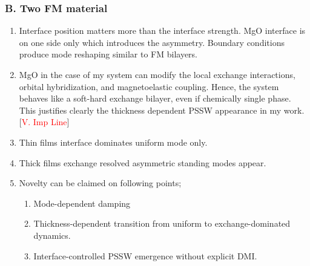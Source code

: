 \subsubsection*{\centering B. Two FM material}
\begin{enumerate}
    \item Interface position matters more than the interface strength. MgO interface is on one side only which introduces the asymmetry. Boundary conditions produce mode reshaping similar to FM bilayers.
    \item MgO in the case of my system can modify the local exchange interactions, orbital hybridization, and magnetoelastic coupling. Hence, the system behaves like a soft-hard exchange bilayer, even if chemically single phase. This justifies clearly the thickness dependent PSSW appearance in my work. [\textcolor{red}{V. Imp Line}]
    \item Thin films  interface dominates  uniform mode only.
    \item Thick films  exchange resolved  asymmetric standing modes appear.
    \item Novelty can be claimed on following points;
    \begin{enumerate}[\ding{212}]
        \item Mode-dependent damping
        \item Thickness-dependent transition from uniform to exchange-dominated dynamics.
        \item Interface-controlled PSSW emergence without explicit DMI.
    \end{enumerate}
\end{enumerate}
